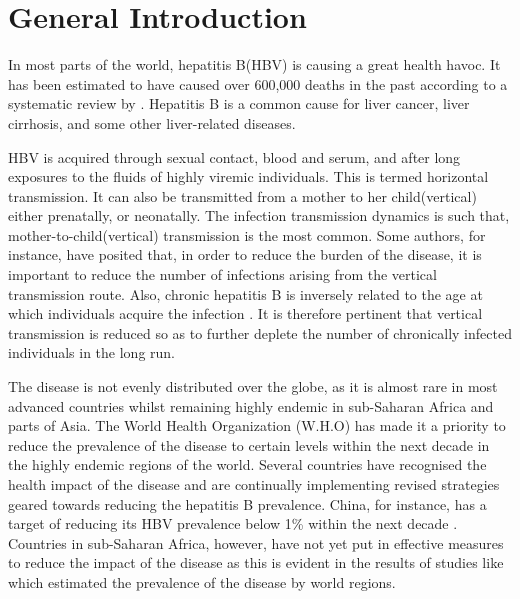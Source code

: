 \section{General Introduction}
In most parts of the world, hepatitis B(HBV) is causing a great health havoc. It has been estimated to have caused over 600,000 deaths in the past according to a systematic review by \cite{ott2012GlobalEpidemiology}. Hepatitis B is a common cause for liver cancer, liver cirrhosis, and some other liver-related diseases.  

HBV is acquired  through sexual contact, blood and serum, and after long exposures to the fluids of highly viremic individuals. This is termed horizontal transmission. It can also be transmitted from a mother to her child(vertical) either prenatally, or neonatally. The infection transmission dynamics is such that, mother-to-child(vertical) transmission is the most common\cite{tran2009management}. Some authors, for instance, \cite{tran2009management,andersson2015mother} have posited that, in order to reduce the burden of the disease, it is important to reduce the number of infections arising from the vertical transmission route. Also,  chronic hepatitis B is inversely related to the age at which individuals acquire the infection\cite{tran2009management} . It is therefore pertinent that vertical transmission is reduced so as to further deplete the number of chronically infected individuals in the long run. 

The disease is not evenly distributed over the globe, as it is almost rare in most advanced countries whilst remaining highly endemic in sub-Saharan Africa and parts of Asia\cite{medley2001hepatitis}. The World Health Organization (W.H.O) has made it a priority to reduce the prevalence of the disease to certain levels within the next decade in the highly endemic regions of the world. Several countries have recognised the health impact of the disease and are continually implementing revised strategies geared towards reducing the hepatitis B prevalence. China, for instance, has a target of reducing its HBV prevalence below 1\% within the next decade \cite{pang2010DynamicalBehaviour}. Countries in sub-Saharan Africa, however, have not yet put in effective measures to reduce the impact of the disease as this is evident in the results of studies like \cite{ott2012GlobalEpidemiology} which estimated the prevalence of the disease by world regions. 

